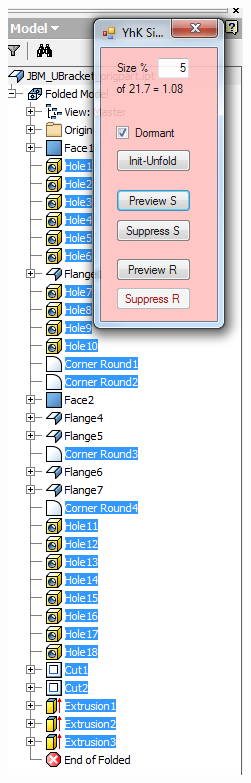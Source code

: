 \begin{minipage}{\linewidth}
\begin{minipage}[c]{0.62\linewidth}
\end{minipage}
\quad
\begin{minipage}[c]{0.3\linewidth}
\includegraphics[width=\linewidth,valign=t]{../Common/images/JBM_UBracket_PhI_tree}
 \label{fig:results:JBM_UBracket_PhItree}
\end{minipage}
\end{minipage}
%
%
%



